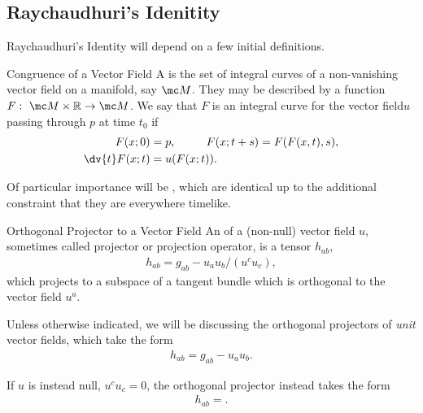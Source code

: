 \newpage
\setcounter{secnumdepth}{0}
\newpage




\subsection{Raychaudhuri's Idenitity}
Raychaudhuri's Identity will depend on a few initial definitions.


\begin{definition}{Congruence of a Vector Field}{}
A  is the set of integral curves of a non-vanishing vector field on a manifold, say \(\mc M\).
%
They may be described by a function \(F:~\mc M \times \mathbb{R} \to \mc M\).
%
We say that \(F\) is an integral curve for the vector field\(u\) passing through \(p\) at time \(t_0\) if
\begin{equation}
\begin{aligned}
    F(x; 0) &= p,
    ~~~~~~~~
    F(x; t + s) = F(F(x, t), s),
    \\
    \dv{t}F(x; t) &= u(F(x; t))
    .
\end{aligned}
\end{equation}

Of particular importance will be , which are identical up to the additional constraint that they are everywhere timelike.
\end{definition}


\begin{definition}{Orthogonal Projector to a Vector Field}{}
An  of a (non-null) vector field \(u\), sometimes called projector or projection operator, is a tensor \(h_{ab}\),
\begin{align}
    h_{ab} = g_{ab} - u_a u_b / (u^c u_c)
    ,
\end{align}
which projects to a subspace of a tangent bundle which is orthogonal to the vector field \(u^a\).

Unless otherwise indicated, we will be discussing the orthogonal projectors of \textit{unit} vector fields, which take the form
\begin{align}
    h_{ab} = g_{ab} - u_a u_b
    .
\end{align}

If \(u\) is instead null, \(u^c u_c = 0\), the orthogonal projector instead takes the form
\begin{align}
h_{ab} = 
.
\end{align}

\end{definition}

